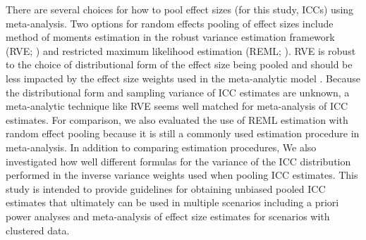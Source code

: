 There are several choices for how to pool effect sizes (for this study, ICCs) using meta-analysis. Two options for random effects pooling of effect sizes include method of moments estimation in the robust variance estimation framework (RVE; \cite{hedges2010}) and restricted maximum likelihood estimation (REML; \cite{viechtbauer2015}). RVE is robust to the choice of distributional form of the effect size being pooled and should be less impacted by the effect size weights used in the meta-analytic model \cite{hedges2010}. Because the distributional form and sampling variance of ICC estimates are unknown, a meta-analytic technique like RVE seems well matched for meta-analysis of ICC estimates. For comparison, we also evaluated the use of REML estimation with random effect pooling because it is still a commonly used estimation procedure in meta-analysis. In addition to comparing estimation procedures, We also investigated how well different formulas for the variance of the ICC distribution performed in the inverse variance weights used when pooling ICC estimates. This study is intended to provide guidelines for obtaining unbiased pooled ICC estimates that ultimately can be used in multiple scenarios including a priori power analyses and meta-analysis of effect size estimates for scenarios with clustered data.





